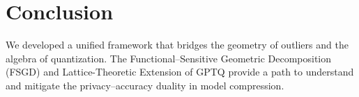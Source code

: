 \documentclass[letterpaper,twocolumn,10pt]{article}
\begin{document}
\section{Conclusion}
We developed a unified framework that bridges the geometry of outliers and the algebra of quantization.
The Functional–Sensitive Geometric Decomposition (FSGD) and Lattice-Theoretic Extension of GPTQ provide 
a path to understand and mitigate the privacy–accuracy duality in model compression.



\end{document}
